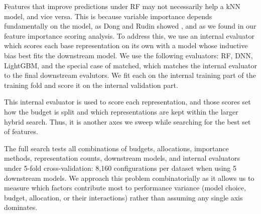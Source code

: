 
Features that improve predictions under RF may not necessarily help a kNN model, and vice versa. This is because variable importance depends fundamentally on the model, as Dong and Rudin showed \citep{Dong2020}, and as we found in our feature importance scoring analysis. To address this, we use an internal evaluator which scores each base representation on its own with a model whose inductive bias best fits the downstream model. We use the following evaluators: RF, DNN, LightGBM, and the special case of matched, which matches the internal evaluator to the final downstream evalutors. We fit each on the internal training part of the training fold and score it on the internal validation part.

This internal evaluator is used to score each representation, and those scores set how the budget is split and which representations are kept within the larger hybrid search. Thus, it is another axes we sweep while searching for the best set of features.



The full search tests all combinations of budgets, allocations, importance methods, representation counts, downstream models, and internal evaluators under 5-fold cross-validation: 8,160 configurations per dataset when using 5 downstream models. We approach this problem combinatorially as it allows us to measure which factors contribute most to performance variance (model choice, budget, allocation, or their interactions) rather than assuming any single axis dominates.

